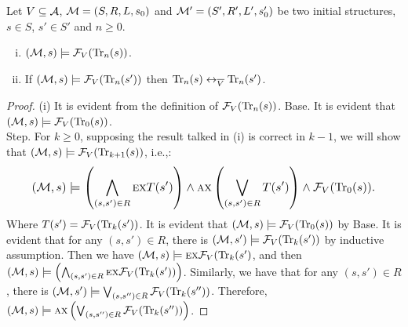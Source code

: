 \documentclass{article}
\begin{document}
 \begin{lemma}\label{Bn:to:Tn}
 Let $V\subseteq {\cal A}$, ${\cal M}=(S, R, L,s_0)$ and ${\cal M}'=(S', R', L',s_0')$ be two initial structures,
 $s\in S$, $s'\in S'$ and $n\ge 0$.
 \begin{enumerate}[(i)]
   \item $({\cal M},s)\models{\cal F}_V(\textrm{Tr}_n(s))$.
   \item If $({\cal M},s)\models{\cal F}_V(\textrm{Tr}_n(s'))$ then
   $\textrm{Tr}_n(s) \leftrightarrow_{\overline V} \textrm{Tr}_n(s')$.
 \end{enumerate}
 \end{lemma}
 \begin{proof}
 (i) It is evident from the definition of ${\cal F}_V(\textrm{Tr}_n(s))$.
 Base. It is evident that $({\cal M},s)\models {\cal F}_V(\textrm{Tr}_0(s))$.\\
 Step. For $k \geq 0$, supposing the result talked in (i) is correct in $k - 1$, we will show that $({\cal M},s)\models {\cal F}_V(\textrm{Tr}_{k+1}(s))$, i.e.,:
 \begin{equation*}
 \resizebox{.91\linewidth}{!}{$
     \displaystyle
  ({\cal M},s)\models \left(\bigwedge_{(s,s')\in R}
     \EXIST \NEXT T(s')\right)
     \wedge \ALL \NEXT\left(\bigvee_{(s,s')\in R}
     T(s')\right)
     \wedge {\cal F}_V(\Tr_0(s)).%
  $}
 \end{equation*}
 Where $T(s') ={\cal F}_V(\textrm{Tr}_k(s'))$. It is evident that $({\cal M},s)\models {\cal F}_V(\textrm{Tr}_0(s))$ by Base. It is evident that for any $(s,s') \in R$, there is $({\cal M}, s') \models {\cal F}_V(\textrm{Tr}_k(s'))$ by inductive assumption. Then we have $({\cal M},s)\models \textsc{e} \textsc{x} {\cal F}_V(\textrm{Tr}_k(s')$, and then $({\cal M},s)\models \left(\bigwedge_{(s,s')\in R}
     \textsc{e} \textsc{x} {\cal F}_V(\textrm{Tr}_k(s'))\right)$. Similarly, we have that for any $(s,s') \in R$, there is $({\cal M}, s') \models \bigvee_{(s,s'')\in R}
     {\cal F}_V(\textrm{Tr}_k(s'') )$. Therefore, $({\cal M},s)\models \textsc{a} \textsc{x}\left(\bigvee_{(s,s'')\in R}
     {\cal F}_V(\textrm{Tr}_k(s'') )\right)$.


\end{proof}
\end{document}
